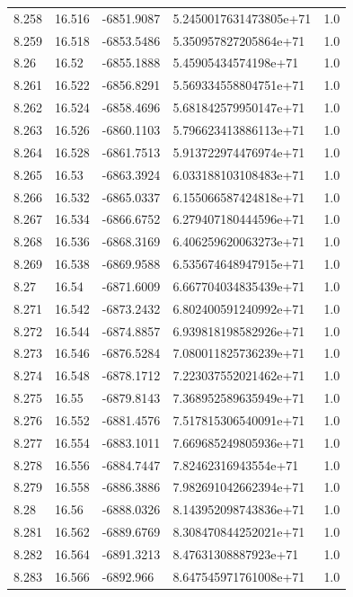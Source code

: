 \begin{tabular}{lllll}
8.258 & 16.516 & -6851.9087 & 5.2450017631473805e+71 & 1.0 \\
8.259 & 16.518 & -6853.5486 & 5.350957827205864e+71 & 1.0 \\
8.26 & 16.52 & -6855.1888 & 5.45905434574198e+71 & 1.0 \\
8.261 & 16.522 & -6856.8291 & 5.569334558804751e+71 & 1.0 \\
8.262 & 16.524 & -6858.4696 & 5.681842579950147e+71 & 1.0 \\
8.263 & 16.526 & -6860.1103 & 5.796623413886113e+71 & 1.0 \\
8.264 & 16.528 & -6861.7513 & 5.913722974476974e+71 & 1.0 \\
8.265 & 16.53 & -6863.3924 & 6.033188103108483e+71 & 1.0 \\
8.266 & 16.532 & -6865.0337 & 6.155066587424818e+71 & 1.0 \\
8.267 & 16.534 & -6866.6752 & 6.279407180444596e+71 & 1.0 \\
8.268 & 16.536 & -6868.3169 & 6.406259620063273e+71 & 1.0 \\
8.269 & 16.538 & -6869.9588 & 6.535674648947915e+71 & 1.0 \\
8.27 & 16.54 & -6871.6009 & 6.667704034835439e+71 & 1.0 \\
8.271 & 16.542 & -6873.2432 & 6.802400591240992e+71 & 1.0 \\
8.272 & 16.544 & -6874.8857 & 6.939818198582926e+71 & 1.0 \\
8.273 & 16.546 & -6876.5284 & 7.080011825736239e+71 & 1.0 \\
8.274 & 16.548 & -6878.1712 & 7.223037552021462e+71 & 1.0 \\
8.275 & 16.55 & -6879.8143 & 7.368952589635949e+71 & 1.0 \\
8.276 & 16.552 & -6881.4576 & 7.517815306540091e+71 & 1.0 \\
8.277 & 16.554 & -6883.1011 & 7.669685249805936e+71 & 1.0 \\
8.278 & 16.556 & -6884.7447 & 7.82462316943554e+71 & 1.0 \\
8.279 & 16.558 & -6886.3886 & 7.982691042662394e+71 & 1.0 \\
8.28 & 16.56 & -6888.0326 & 8.143952098743836e+71 & 1.0 \\
8.281 & 16.562 & -6889.6769 & 8.308470844252021e+71 & 1.0 \\
8.282 & 16.564 & -6891.3213 & 8.47631308887923e+71 & 1.0 \\
8.283 & 16.566 & -6892.966 & 8.647545971761008e+71 & 1.0 \\

\end{tabular}
